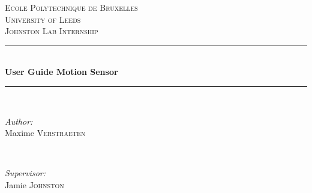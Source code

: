 \documentclass[a4paper]{article}
\begin{document}
\begin{titlepage}

\newcommand{\HRule}{\rule{\linewidth}{0.5mm}} %

\center %
 

\textsc{\LARGE Ecole Polytechnique de Bruxelles}\\[1.5cm] %
\textsc{\LARGE University of Leeds}\\[1.5cm]
\textsc{\large Johnston Lab Internship}\\[0.5cm] %


\HRule \\[0.4cm]
{ \huge \bfseries User Guide Motion Sensor}\\[0.4cm] %
\HRule \\[1.5cm]
 

\begin{minipage}{0.4\textwidth}
\begin{flushleft} \large
\emph{Author:}\\
Maxime \textsc{Verstraeten} %
\end{flushleft}
\end{minipage}
~
\begin{minipage}{0.4\textwidth}
\begin{flushright} \large
\emph{Supervisor:} \\
Jamie \textsc{Johnston}\\[0.3cm] %
\end{flushright}
\end{minipage}\\[2cm]



\end{titlepage}
\end{document}
